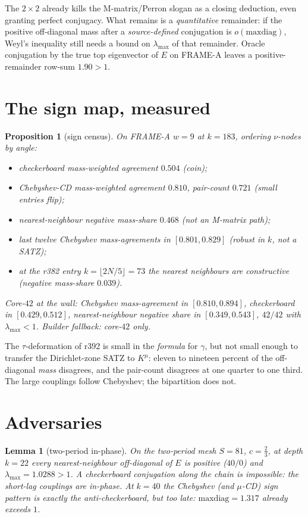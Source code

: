 \documentclass[11pt]{article}
\newtheorem{lemma}{Lemma}
\newtheorem{prop}{Proposition}
\theoremstyle{remark}
\begin{document}
The $2\times 2$ already kills the M-matrix/Perron slogan as a
closing deduction, even granting perfect conjugacy.
What remains is a \emph{quantitative} remainder: if the
positive off-diagonal mass after a \emph{source-defined}
conjugation is $o(\mathrm{maxdiag})$, Weyl's inequality still
needs a bound on $\lambda_{\max}$ of that remainder.
Oracle conjugation by the true top eigenvector of $E$ on
FRAME-A leaves a positive-remainder row-sum $1.90>1$.

\section{The sign map, measured}\label{sec:map}

\begin{prop}[sign census]\label{prop:map}
On FRAME-A $w=9$ at $k=183$, ordering $\nu$-nodes by angle:
\begin{itemize}
\item checkerboard mass-weighted agreement $0.504$ (coin);
\item Chebyshev-CD mass-weighted agreement $0.810$,
pair-count $0.721$ (small entries flip);
\item nearest-neighbour negative mass-share $0.468$
(not an M-matrix path);
\item last twelve Chebyshev mass-agreements in
$[0.801,0.829]$ (robust in $k$, not a SATZ);
\item at the r382 entry $k=\lfloor 2N/5\rfloor=73$ the
nearest neighbours are \emph{constructive}
(negative mass-share $0.039$).
\end{itemize}
Core-$42$ at the wall: Chebyshev mass-agreement in
$[0.810,0.894]$, checkerboard in $[0.429,0.512]$,
nearest-neighbour negative share in $[0.349,0.543]$,
$42/42$ with $\lambda_{\max}<1$.
Builder fallback: core-$42$ only.
\end{prop}

The $\tau$-deformation of r392 is small in the
\emph{formula} for $\gamma$, but not small enough to transfer
the Dirichlet-zone SATZ to $K^\mu$: eleven to nineteen percent
of the off-diagonal \emph{mass} disagrees, and the pair-count
disagrees at one quarter to one third.
The large couplings follow Chebyshev; the bipartition does not.

\section{Adversaries}\label{sec:kills}

\begin{lemma}[two-period in-phase]\label{lem:inphase}
On the two-period mesh $S=81$, $c=\tfrac23$, at depth $k=22$
every nearest-neighbour off-diagonal of $E$ is positive
($40/0$) and $\lambda_{\max}=1.0288>1$.
A checkerboard conjugation along the chain is impossible:
the short-lag couplings are in-phase.
At $k=40$ the Chebyshev (and $\mu$-CD) sign pattern
\emph{is} exactly the anti-checkerboard, but too late:
$\mathrm{maxdiag}=1.317$ already exceeds $1$.
\end{lemma}
\end{document}
